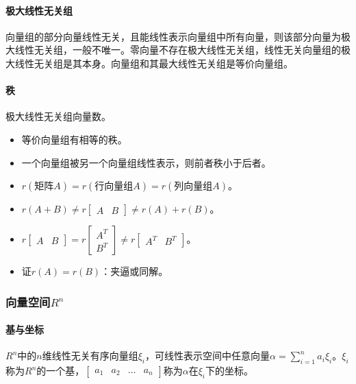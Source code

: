 \documentclass[
12pt, %
a4paper, 
oneside, %
]{scrartcl}
\begin{document}
\paragraph{极大线性无关组}
向量组的部分向量线性无关，且能线性表示向量组中所有向量，则该部分向量为极大线性无关组，一般不唯一。零向量不存在极大线性无关组，线性无关向量组的极大线性无关组是其本身。向量组和其最大线性无关组是等价向量组。
\paragraph{秩}
极大线性无关组向量数。
\begin{itemize}
\item 等价向量组有相等的秩。
\item 一个向量组被另一个向量组线性表示，则前者秩小于后者。
\item $ r(\text{矩阵}A) = r(\text{行向量组}A) = r(\text{列向量组}A) $。
\item $ r(A + B) \neq r \begin{bmatrix} A & B \end{bmatrix} \neq r(A) + r(B) $。
\item $ r \begin{bmatrix} A & B \end{bmatrix} = r \begin{bmatrix} A^T \\ B^T \end{bmatrix} \neq r \begin{bmatrix} A^T & B^T \end{bmatrix} $。
\item 证$ r(A) = r(B) $：夹逼或同解。
\end{itemize}
\subsubsection[向量空间]{向量空间$ R^n $}
\paragraph{基与坐标}
$ R^n $中的$ n $维线性无关有序向量组$ \xi_i $，可线性表示空间中任意向量$ \alpha = \sum_{i = 1}^n a_i \xi_i $。$ \xi_i $称为$ R^n $的一个基，$ \begin{bmatrix} a_1 & a_2 & \dots & a_n \end{bmatrix} $称为$ \alpha $在$ \xi_i $下的坐标。
\end{document}
